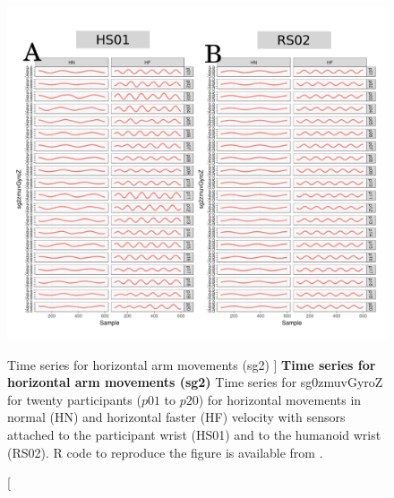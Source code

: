 \begin{figure}
\centering
\includegraphics[width=1.0\textwidth]{aH-sg2}
    	\caption
	[Time series for horizontal arm movements (sg2) ]{
	{\bf Time series for horizontal arm movements (sg2)}
		Time series for sg0zmuvGyroZ for twenty participants 
		($p01$ to  $p20$) 
		for horizontal movements in normal (HN) and horizontal faster (HF) 
		velocity with sensors attached to the participant wrist (HS01)
		and to the humanoid wrist (RS02).
	R code to reproduce the figure is available from \cite{xochicale2018}.
        }
    \label{fig:aH-sg2}
\end{figure}





